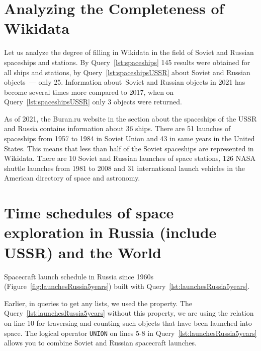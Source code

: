\section{Analyzing the Completeness of Wikidata}

Let us analyze the degree of filling in Wikidata in the field of Soviet and Russian spaceships and stations.
By Query~\ref{lst:spaceships} 145 results were obtained for all ships and stations,
by Query~\ref{lst:spaceshipsUSSR} about Soviet and Russian objects~--- only 25.
Information about~Soviet and Russian objects in 2021
has become several times more compared to 2017,
when on Query~\ref{lst:spaceshipsUSSR} only 3 objects were returned.

As of 2021, the Buran.ru website in the section about the spaceships of the USSR and Russia contains information about 36 ships.\autocite{spacecraftBuran} %
There are 51 launches of spaceships from 1957 to 1984 in Soviet Union and 43 in same years in the United States.\autocite[480-483]{spacecraftCosmonavtika} This means that less than half of the Soviet spaceships are represented in Wikidata.
There are 10 Soviet and Russian launches of space stations\autocite[296]{spacecraftSAA},
126 NASA shuttle launches from 1981 to 2008\autocite[288]{spacecraftSAA}
and 31 international launch vehicles\autocite[290-291]{spacecraftSAA} in the American directory of space and astronomy.

\section{Time schedules of space exploration in Russia (include USSR) and the World}

Spacecraft launch schedule in Russia since 1960s (Figure~\ref{fig:launchesRussia5years})
built with Query~\ref{lst:launchesRussia5years}.%

Earlier, in queries to get any lists, we used the  property.
The Query~\ref{lst:launchesRussia5years} without this property, we are using the relation
 on line 10
for traversing and counting such objects that have been launched into space.
%
\label{question:spacecraft_1}%
%
%
The logical operator \lstinline|UNION| on lines 5-8 in Query~\ref{lst:launchesRussia5years}
allows you to combine Soviet and Russian spacecraft launches.

